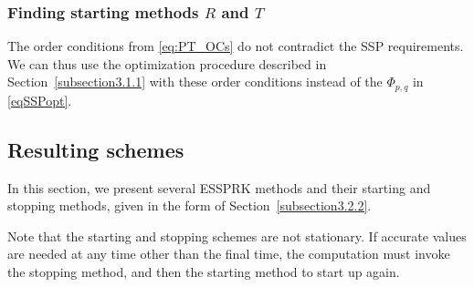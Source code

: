 

\subsubsection{Finding starting methods $ R $ and $ T $}\label{subsection3.2.3}


The order conditions from \eqref{eq:PT_OCs} do not contradict the SSP
requirements.  We can thus use the optimization procedure described in
Section~\ref{subsection3.1.1} with these order conditions instead of
the $\Phi_{p,q}$ in \eqref{eqSSPopt}.  


\subsection{Resulting schemes}

In this section, we present several ESSPRK methods and their starting
and stopping methods, given in the form of
Section~\ref{subsection3.2.2}.

Note that the starting and stopping schemes are not stationary.  If
accurate values are needed at any time other than the final time, the
computation must invoke the stopping method, and then the starting method to start up again. 

